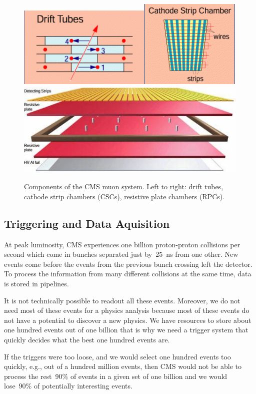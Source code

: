 \begin{figure}[htb]
  \begin{center}
    \includegraphics[height=2.5 cm]{../figs/Exp/muonSystem_driftTubes.png}\quad\includegraphics[height=2.5 cm]{../figs/Exp/muonSystem_CSC.png}\quad\includegraphics[height=2.5 cm]{../figs/Exp/muonSystem_RPC.png}
    \caption{Components of the CMS muon system. Left to right: drift tubes, cathode strip chambers (CSCs), resistive plate chambers (RPCs).}
    \label{fig:muonSystem}
  \end{center}
\end{figure}


\subsection{Triggering and Data Aquisition}

At peak luminosity, CMS experiences one billion proton-proton collisions per second which come in bunches separated just by~25~ns from one other. New events come before the events from the previous bunch crossing left the detector. To process the information from many different collisions at the same time, data is stored in pipelines. 

It is not technically possible to readout all these events. Moreover, we do not need most of these events for a physics analysis because most of these events do not have a potential to discover a new physics. We have resources to store about one hundred events out of one billion that is why we need a trigger system that quickly decides what the best one hundred events are.

If the triggers were too loose, and we would select one hundred events too quickly, e.g., out of a hundred million events, then CMS would not be able to process the rest~90\% of events in a given set of one billion and we would lose~90\% of potentially interesting events.

